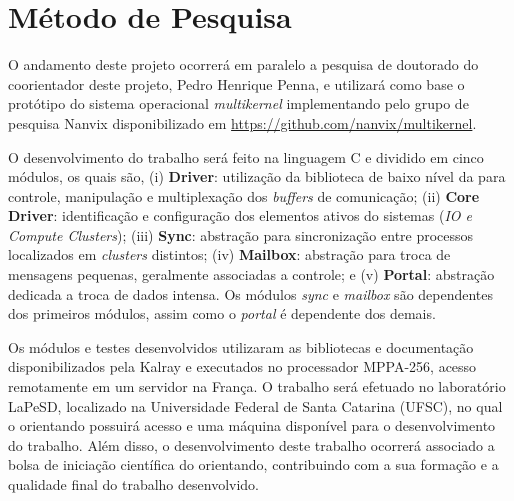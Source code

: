 \documentclass[
	12pt,				%
	openright,			%
	twoside,			%
	a4paper,			%
	english,			%
	brazil,				%
	]{abntex2}
\begin{document}
\section{Método de Pesquisa}
 O andamento deste projeto ocorrerá em paralelo a pesquisa de doutorado do coorientador deste projeto, Pedro Henrique Penna, e utilizará como base o protótipo do sistema operacional \textit{multikernel} implementando pelo grupo de pesquisa Nanvix \cite{Penna2017,Penna2017-1} disponibilizado em \url{https://github.com/nanvix/multikernel}.

O desenvolvimento do trabalho será feito na linguagem C e dividido em cinco módulos, os quais são,
(i) \textbf{\noc Driver}: utilização da biblioteca de baixo nível da \noc para controle, manipulação e multiplexação dos \textit{buffers} de comunicação;
(ii) \textbf{Core Driver}: identificação e configuração dos elementos ativos do sistemas (\textit{IO e Compute Clusters}); 
(iii) \textbf{Sync}: abstração para sincronização entre processos localizados em \textit{clusters} distintos;
(iv) \textbf{Mailbox}: abstração para troca de mensagens pequenas, geralmente associadas a controle; e 
(v) \textbf{Portal}: abstração dedicada a troca de dados intensa. Os módulos \textit{sync} e \textit{mailbox} são dependentes dos primeiros módulos, assim como o \textit{portal} é dependente dos demais.

Os módulos e testes desenvolvidos utilizaram as bibliotecas e documentação disponibilizados pela Kalray e executados no processador MPPA-256, acesso remotamente em um servidor na França. O trabalho será efetuado no laboratório LaPeSD, localizado na Universidade Federal de Santa Catarina (UFSC), no qual o orientando possuirá acesso e uma máquina disponível para o desenvolvimento do trabalho. Além disso, o desenvolvimento deste trabalho ocorrerá associado a bolsa de iniciação científica do orientando, contribuindo com a sua formação e a qualidade final do trabalho desenvolvido.


\end{document}
